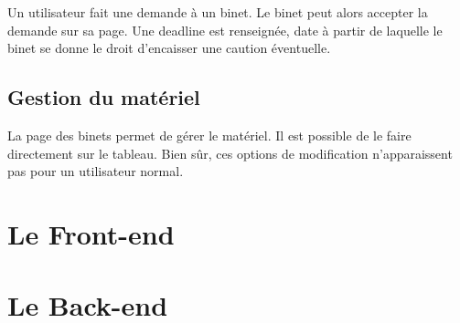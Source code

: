 \documentclass[titlepage,11pt,a4paper]{article}
\begin{document}
Un utilisateur fait une demande à un binet. Le binet peut alors accepter la demande sur sa page. Une deadline est renseignée, date à partir de laquelle le binet se donne le droit d'encaisser une caution éventuelle.

\subsection{Gestion du matériel}

La page des binets permet de gérer le matériel. Il est possible de le faire directement sur le tableau. Bien sûr, ces options de modification n'apparaissent pas pour un utilisateur normal. 


\section{Le Front-end}

\section{Le Back-end}


\end{document}
